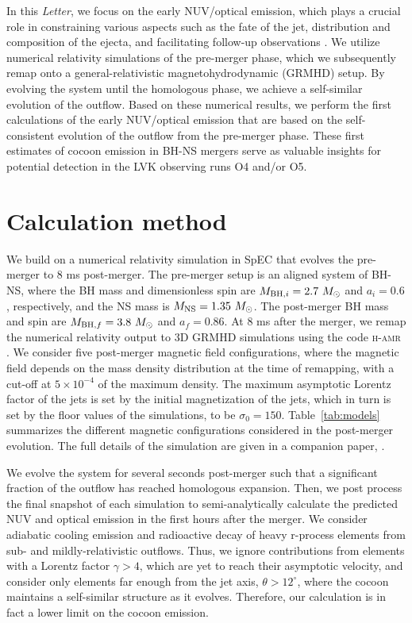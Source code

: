\documentclass[twocolumn,dvipsnames]{aastex62}
\newcommand{\msun}{\,{M_{\odot}}}
\begin{document}
In this {\it Letter}, we focus on the early NUV/optical emission, which plays a crucial role in constraining various aspects such as the fate of the jet, distribution and composition of the ejecta, and facilitating follow-up observations \citep[however, the multiple predictions rise difficulties in discriminating the potential signals, see][]{Arcavi2018,Gottlieb2020c}. We utilize numerical relativity simulations of the pre-merger phase, which we subsequently remap onto a general-relativistic magnetohydrodynamic (GRMHD) setup. By evolving the system until the homologous phase, we achieve a self-similar evolution of the outflow. Based on these numerical results, we perform the first calculations of the early NUV/optical emission that are based on the self-consistent evolution of the outflow from the pre-merger phase. These first estimates of cocoon emission in BH-NS mergers serve as valuable insights for potential detection in the LVK observing runs O4 and/or O5.

\section{Calculation method}\label{sec:setup}

We build on a numerical relativity simulation in SpEC \citep{spec} that evolves the pre-merger to 8 ms post-merger. The pre-merger setup is an aligned system of BH-NS, where the BH mass and dimensionless spin are $ M_{{\rm BH},i} = 2.7\,\msun $ and $ a_i = 0.6 $, respectively, and the NS mass is $ M_{\rm NS} = 1.35\,\msun $. The post-merger BH mass and spin are $ M_{{\rm BH},f} = 3.8\,\msun $ and $ a_f = 0.86 $.
At 8 ms after the merger, we remap the numerical relativity output to 3D GRMHD simulations using the code \textsc{h-amr} \citep{Liska2022}. We consider five post-merger magnetic field configurations, where the magnetic field depends on the mass density distribution at the time of remapping, with a cut-off at $ 5\times 10^{-4} $ of the maximum density. The maximum asymptotic Lorentz factor of the jets is set by the initial magnetization of the jets, which in turn is set by the floor values of the simulations, to be $ \sigma_0 = 150 $.
Table~\ref{tab:models} summarizes the different magnetic configurations considered in the post-merger evolution. The full details of the simulation are given in a companion paper, \citet{Gottlieb2023}.

We evolve the system for several seconds post-merger such that a significant fraction of the outflow has reached homologous expansion. Then, we post process the final snapshot of each simulation to semi-analytically calculate the predicted NUV and optical emission in the first hours after the merger. We consider adiabatic cooling emission and radioactive decay of heavy r-process elements from sub- and mildly-relativistic outflows. Thus, we ignore contributions from elements with a Lorentz factor $ \gamma > 4 $, which are yet to reach their asymptotic velocity, and consider only elements far enough from the jet axis, $ \theta > 12^\circ $, where the cocoon maintains a self-similar structure as it evolves. Therefore, our calculation is in fact a lower limit on the cocoon emission.
\end{document}
